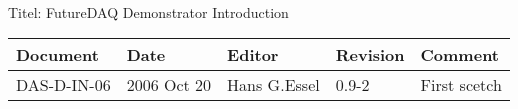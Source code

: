 \\Titel: FutureDAQ Demonstrator Introduction
\begin{table}[h]
\begin{tabular}{|p{2.8cm}|p{2.0cm}|p{3.0cm}|p{1.6cm}|p{5.0cm}|} \hline
Document   & Date        & Editor       & Revision & Comment \\
\hline DAS-D-IN-06 & 2006 Oct 20 & Hans G.Essel & 0.9-2    & First
scetch \\ \hline
\end{tabular}
\end{table}
